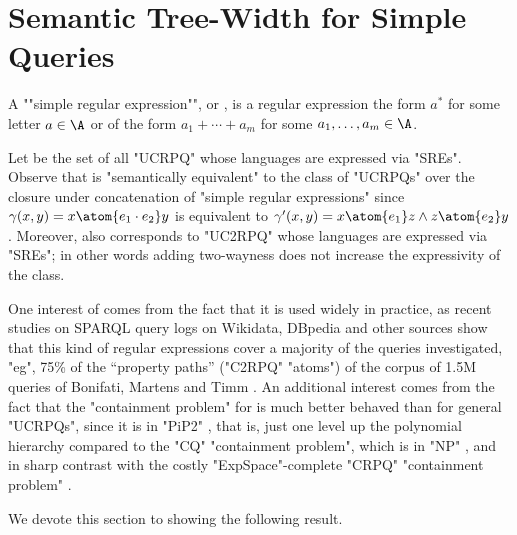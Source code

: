 \section{\AP{}Semantic Tree-Width for Simple Queries}
\label{sec:sre}
\AP A ""simple regular expression"", or , is a regular expression the form $a^*$ for some letter $a \in \A$ or of the form $a_1 + \dotsb + a_m$ for some $a_1, \dotsc, a_m \in \A$. 

\AP Let \intro*{\UCRPQSRE} be the set of all "UCRPQ" whose languages are expressed via "SREs". Observe that {\UCRPQSRE} is "semantically equivalent" to the class of "UCRPQs" over the closure under concatenation of "simple regular expressions"
since $\gamma(x,y) = x \atom{e_1 \cdot e_2} y$ is equivalent to $\gamma'(x,y) = x \atom{e_1} z \land  z \atom{e_2} y$.
Moreover, \UCRPQSRE{} also corresponds to "UC2RPQ" whose languages are expressed via "SREs";
in other words adding two-wayness does not increase the expressivity of the class. 
%

One interest of {\UCRPQSRE} comes from the fact that it is used widely in practice, as recent studies on SPARQL query logs on Wikidata, DBpedia and other sources show that this kind of regular expressions cover a majority of the queries investigated, "eg", 75\% of
the ``property paths'' ("C2RPQ" "atoms") of the corpus of 1.5M queries of Bonifati, Martens and Timm \cite[Table 15]{BonifatiMT-vdlbj20}.
An additional interest comes from the fact that the "containment problem" for {\UCRPQSRE} is much better behaved than for general "UCRPQs", since it is in {"PiP2"} \cite[Corollary 5.2]{FigueiraGKMNT20}, that is, just one level up the polynomial hierarchy compared to the "CQ" "containment problem", which is in "NP" \cite{DBLP:conf/stoc/ChandraM77}, and in sharp contrast with the costly "ExpSpace"-complete "CRPQ" "containment problem" \cite{CGLV00,Florescu:CRPQ}.

We devote this section to showing the following result.

